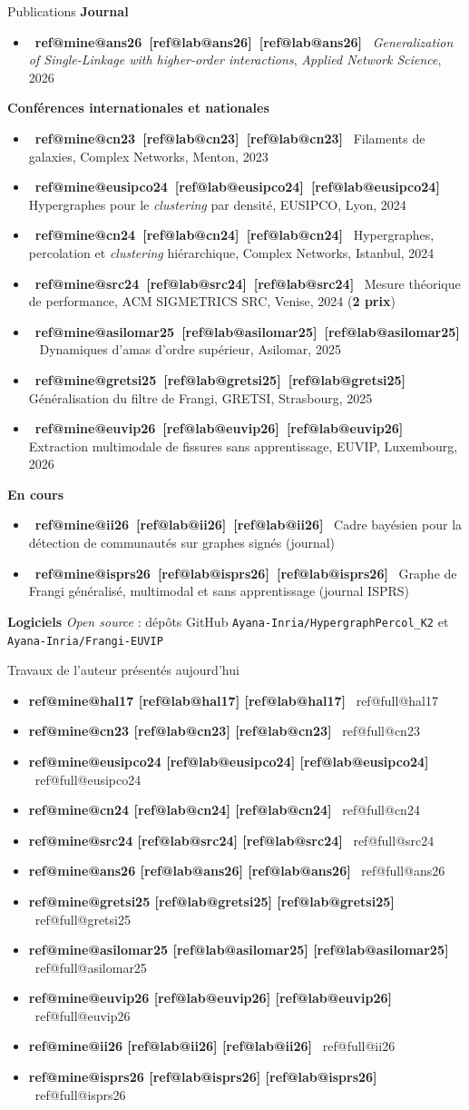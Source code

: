 \documentclass[A4,svgnames,9pt,aspectratio=169]{beamer}
\makeatletter
\newcommand{\refbracket}[1]{%
  \ifcsname ref@mine@#1\endcsname
    \textcolor{inria-rouge}{[\csname ref@lab@#1\endcsname]}%
  \else
    \textcolor{gris_fonce_inria}{[\csname ref@lab@#1\endcsname]}%
  \fi}
\newcommand{\citb}[1]{\mbox{{\footnotesize\bfseries\refbracket{#1}}}}
\newcommand{\bibligne}[1]{\item {\bfseries\refbracket{#1}}\ \csname ref@full@#1\endcsname}
\makeatother
\begin{document}
\begin{frame}{Publications}
    \footnotesize
    \textbf{Journal}
    \begin{itemize}
        \item \citb{ans26} \emph{Generalization of Single-Linkage with higher-order interactions}, \textit{Applied Network Science}, 2026
    \end{itemize}
    \textbf{Conférences internationales et nationales}
    \begin{itemize}
        \item \citb{cn23} Filaments de galaxies, Complex Networks, Menton, 2023
        \item \citb{eusipco24} Hypergraphes pour le \emph{clustering} par densité, EUSIPCO, Lyon, 2024
        \item \citb{cn24} Hypergraphes, percolation et \emph{clustering} hiérarchique, Complex Networks, Istanbul, 2024
        \item \citb{src24} Mesure théorique de performance, ACM SIGMETRICS SRC, Venise, 2024 (\textbf{2 prix})
        \item \citb{asilomar25} Dynamiques d'amas d'ordre supérieur, Asilomar, 2025
        \item \citb{gretsi25} Généralisation du filtre de Frangi, GRETSI, Strasbourg, 2025
        \item \citb{euvip26} Extraction multimodale de fissures sans apprentissage, EUVIP, Luxembourg, 2026
    \end{itemize}
    \textbf{En cours}
    \begin{itemize}
        \item \citb{ii26} Cadre bayésien pour la détection de communautés sur graphes signés (journal)
        \item \citb{isprs26} Graphe de Frangi généralisé, multimodal et sans apprentissage (journal ISPRS)
    \end{itemize}
    \textbf{Logiciels} \emph{Open source} : dépôts GitHub \texttt{Ayana-Inria/HypergraphPercol\_K2}
    et \texttt{Ayana-Inria/Frangi-EUVIP}
\end{frame}

\frame{\merci}

\begin{frame}{Travaux de l'auteur présentés aujourd'hui}
    \scriptsize
    \begin{itemize}
        \setlength{\itemsep}{3pt}
        \bibligne{hal17}
        \bibligne{cn23}
        \bibligne{eusipco24}
        \bibligne{cn24}
        \bibligne{src24}
        \bibligne{ans26}
        \bibligne{gretsi25}
        \bibligne{asilomar25}
        \bibligne{euvip26}
        \bibligne{ii26}
        \bibligne{isprs26}
    \end{itemize}
\end{frame}
\end{document}
